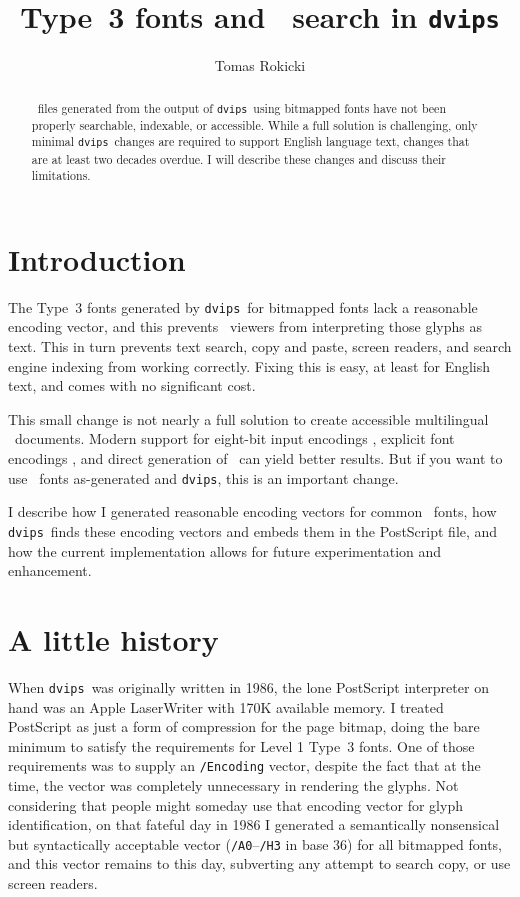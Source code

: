 \documentclass[final]{ltugboat}
\title{Type~3 fonts and \PDF\ search in {\tt dvips}}
\author{Tomas Rokicki}
\def\PDF{\acro{PDF}}
\def\dvips{\texttt{dvips}}
\begin{document}
\maketitle

\begin{abstract}
\PDF\ files generated from the output of \dvips\ using
bitmapped fonts have not been properly searchable,
indexable, or accessible.  While a full solution is challenging,
only minimal \dvips\ changes are required to support
English language text, changes that are at least two decades overdue.
I will describe these changes and discuss their limitations.
\end{abstract}

\section{Introduction}

The Type~3 fonts generated by \dvips\ for bitmapped fonts
lack a reasonable encoding vector, and this prevents \PDF\ 
viewers from interpreting those glyphs as text.  This in turn
prevents text search, copy and paste, screen readers, and
search engine indexing from working correctly.  Fixing this is
easy, at least for English text, and comes with no significant
cost.

This small change is not nearly a full solution to create
accessible multilingual \PDF\ documents.  Modern support
for eight-bit input encodings \cite{ENC}, explicit font encodings \cite{MMAP},
and direct generation of \PDF\ can yield better results.
But if you want to use \MF\ fonts as-generated and \dvips,
this is an important change.

I describe how I generated reasonable encoding vectors
for common \MF\ fonts, how \dvips\ finds these
encoding vectors and embeds them in the PostScript file, and
how the current implementation allows for future
experimentation and enhancement.

\section{A little history}

When \dvips\ was originally written in 1986, the lone
PostScript interpreter on hand was an Apple LaserWriter with
170K available memory.  I treated PostScript as just a form of
compression for the page bitmap, doing the bare minimum to
satisfy the requirements for Level 1 Type~3 fonts.  One of
those requirements was to supply an \texttt{/Encoding} vector,
despite the fact that at the time, the vector was completely
unnecessary in rendering the glyphs.  Not considering that people
might someday use that encoding vector for glyph identification,
on that fateful day in 1986
I generated a semantically nonsensical but syntactically acceptable
vector (\texttt{/A0}--\texttt{/H3} in base 36) for all bitmapped
fonts, and
this vector remains to this day, subverting any attempt to search
copy, or use screen readers.
\end{document}
